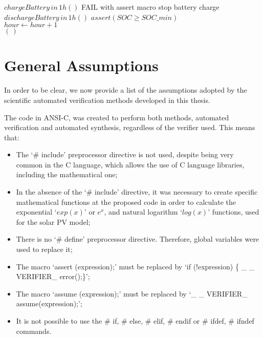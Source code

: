 \begin{algorithm}
\begin{algorithmic}[1]
      \STATE $chargeBattery \, in \, 1h()$ 
      \STATE FAIL with assert macro 
      \STATE stop battery charge 
      \STATE $dischargeBattery \, in \, 1h()$ 
    \ENDIF
    \STATE $assert (SOC \geq SOC \_ min)$ \\
    \STATE $hour \leftarrow hour+1$ \\
   \ENDFOR
  \ENDFOR
 \RETURN $(\,)$ 
 \end{algorithmic} 
 \label{alg:verification-algorithm}
 \end{algorithm}

%

\section{General Assumptions}
\label{sec:assumptions}

In order to be clear, we now provide a list of the assumptions adopted by the scientific automated verification methods developed in this thesis.

The code in ANSI-C, was created to perform both methods, automated verification and automated synthesis, regardless of the verifier used. This means that: 

\begin{itemize}
\item The `\# include' preprocessor directive is not used, despite being very common in the C language, which allows the use of C language libraries, including the mathematical one;
\item In the absence of the `\# include' directive, it was necessary to create specific mathematical functions at the proposed code in order to calculate the exponential `$exp(x)$' or $e^{x}$, and natural logarithm `$log(x)$' functions, used for the solar PV model;
\item There is no `\# define' preprocessor directive. Therefore, global variables were used to replace it;
\item The macro `assert (expression);' must be replaced by `if (!expression) \{ \_ \_ VERIFIER\_ error();\}';
\item The macro `assume (expression);' must be replaced by `\_ \_ VERIFIER\_ assume(expression);';
\item It is not possible to use the \# if, \# else, \# elif, \# endif or \# ifdef, \# ifndef commands.
\end{itemize}

